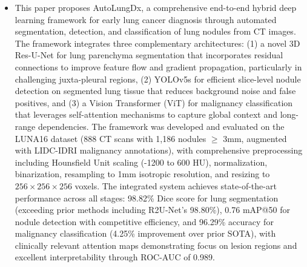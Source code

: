 \begin{itemize}
	\item This paper proposes AutoLungDx, a comprehensive end-to-end hybrid deep learning framework for early lung cancer diagnosis through automated segmentation, detection, and classification of lung nodules from CT images. The framework integrates three complementary architectures: (1) a novel 3D Res-U-Net for lung parenchyma segmentation that incorporates residual connections to improve feature flow and gradient propagation, particularly in challenging juxta-pleural regions, (2) YOLOv5s for efficient slice-level nodule detection on segmented lung tissue that reduces background noise and false positives, and (3) a Vision Transformer (ViT) for malignancy classification that leverages self-attention mechanisms to capture global context and long-range dependencies. The framework was developed and evaluated on the LUNA16 dataset (888 CT scans with 1,186 nodules $\ge$ 3mm, augmented with LIDC-IDRI malignancy annotations), with comprehensive preprocessing including Hounsfield Unit scaling (-1200 to 600 HU), normalization, binarization, resampling to 1mm isotropic resolution, and resizing to $256 \times 256 \times 256$ voxels. The integrated system achieves state-of-the-art performance across all stages: 98.82\% Dice score for lung segmentation (exceeding prior methods including R2U-Net's 98.80\%), 0.76 mAP@50 for nodule detection with competitive efficiency, and 96.29\% accuracy for malignancy classification (4.25\% improvement over prior SOTA), with clinically relevant attention maps demonstrating focus on lesion regions and excellent interpretability through ROC-AUC of 0.989. \cite{Shuvo_2026}
\end{itemize}

